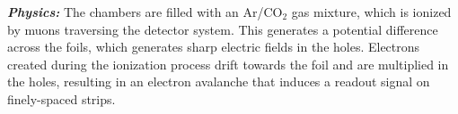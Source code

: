 \textbf{\textit{Physics:}}
The chambers are filled with an Ar/CO$_2$ gas mixture, which is ionized by muons traversing the detector system.
This generates a potential difference across the foils, which generates sharp electric fields in the holes.
Electrons created during the ionization process drift towards the foil and are multiplied in the holes, resulting in an electron avalanche that induces a readout signal on finely-spaced strips.







